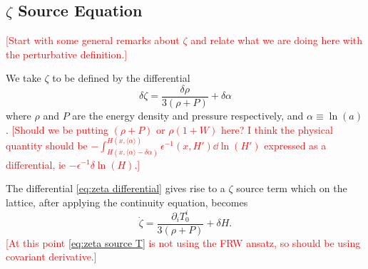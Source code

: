 \subsection{$\zeta$ Source Equation} \label{sec:zeta source}
\textcolor{red}{[Start with some general remarks about $\zeta$ and relate what we are doing here with the perturbative definition.]}



We take $\zeta$ to be defined by the differential
\begin{equation} \label{eq:zeta differential}
  \delta\zeta = \frac{\delta\rho}{3(\rho + P)} + \delta\alpha
\end{equation}
where $\rho$ and $P$ are the energy density and pressure respectively, and $\alpha \equiv \ln(a)$.
\textcolor{red}{[Should we be putting $(\rho+P)$ or $\rho(1+W)$ here? I think the physical quantity should be $-\int_{H(x,\langle\alpha\rangle-\delta\alpha)}^{H(x,\langle\alpha\rangle)}\epsilon^{-1}(x,H')\dd\ln(H')$ expressed as a differential, ie $-\epsilon^{-1}\delta\ln(H)$.]}

The differential \eqref{eq:zeta differential} gives rise to a $\zeta$ source term which on the lattice, after applying the continuity equation, becomes
\begin{equation} \label{eq:zeta source T}
  \dot{\zeta} = \frac{\partial_iT^i_0}{3(\rho+P)} + \delta H. %
\end{equation}
\textcolor{red}{[At this point \eqref{eq:zeta source T} is not using the FRW ansatz, so should be using covariant derivative.]}

